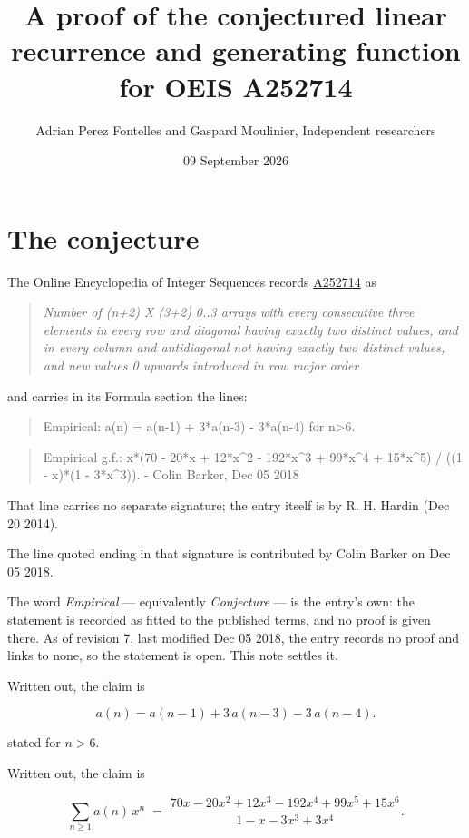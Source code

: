\documentclass[11pt]{article}
\title{A proof of the conjectured linear recurrence and generating function for OEIS A252714}
\author{Adrian Perez Fontelles and Gaspard Moulinier, Independent researchers}
\date{09 September 2026}
\theoremstyle{definition}
\begin{document}
\maketitle
\section{The conjecture}

The Online Encyclopedia of Integer Sequences records \href{https://oeis.org/A252714}{A252714} as

\begin{quote}\itshape Number of (n+2) X (3+2) 0..3 arrays with every consecutive three elements in every row and diagonal having exactly two distinct values, and in every column and antidiagonal not having exactly two distinct values, and new values 0 upwards introduced in row major order\end{quote}

and carries in its Formula section the lines:

\begin{quote}\ttfamily Empirical: a(n) = a(n-1) + 3*a(n-3) - 3*a(n-4) for n>6.\end{quote}

\begin{quote}\ttfamily Empirical g.f.: x*(70 - 20*x + 12*x\textasciicircum{}2 - 192*x\textasciicircum{}3 + 99*x\textasciicircum{}4 + 15*x\textasciicircum{}5) / ((1 - x)*(1 - 3*x\textasciicircum{}3)). - Colin Barker, Dec 05 2018\end{quote}

That line carries no separate signature; the entry itself is by R. H. Hardin (Dec 20 2014).

The line quoted ending in that signature is contributed by Colin Barker on Dec 05 2018.

The word {\itshape Empirical} --- equivalently {\itshape Conjecture} --- is the entry's own: the statement is recorded as fitted to the published terms, and no proof is given there. As of revision 7, last modified Dec 05 2018, the entry records no proof and links to none, so the statement is open. This note settles it.

Written out, the claim is

\[a(n) = a(n-1) + 3\,a(n-3) - 3\,a(n-4).\]

stated for $n > 6$.

Written out, the claim is

\[\sum_{n \ge 1} a(n)\,x^n \;=\; \frac{70x - 20x^{2} + 12x^{3} - 192x^{4} + 99x^{5} + 15x^{6}}{1 - x - 3x^{3} + 3x^{4}}.\]
\end{document}
